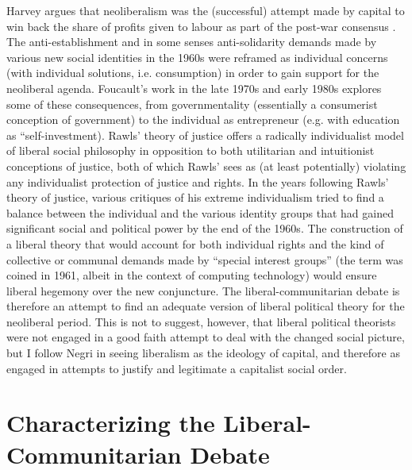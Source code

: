 \documentclass[12pt,oneside]{memoir}
\begin{document}
 Harvey argues that neoliberalism was the (successful) attempt made by capital to win back the share of profits given to labour as part of the post-war consensus \citep{harvey-2005}. The anti-establishment and in some senses anti-solidarity demands made by various new social identities in the 1960s were reframed as individual concerns (with individual solutions, i.e. consumption) in order to gain support for the neoliberal agenda. Foucault's work in the late 1970s and early 1980s explores some of these consequences, from governmentality (essentially a consumerist conception of government) to the individual as entrepreneur (e.g. with education as ``self-investment). Rawls' theory of justice offers a radically individualist model of liberal social philosophy in opposition to both utilitarian and intuitionist conceptions of justice, both of which Rawls' sees as (at least potentially) violating any individualist protection of justice and rights.
In the years following Rawls' theory of justice, various critiques of his extreme individualism tried to find a balance between the individual and the various identity groups that had gained significant social and political power by the end of the 1960s. The construction of a liberal theory that would account for both individual rights and the kind of collective or communal demands made by ``special interest groups'' (the term was coined in 1961, albeit in the context of computing technology) would ensure liberal hegemony over the new conjuncture. The liberal-communitarian debate is therefore an attempt to find an adequate version of liberal political theory for the neoliberal period. This is not to suggest, however, that liberal political theorists were not engaged in a good faith attempt to deal with the changed social picture, but I follow Negri in seeing liberalism as the ideology of capital, and therefore as engaged in attempts to justify and legitimate a capitalist social order.

\section*{Characterizing the Liberal-Communitarian Debate}
\end{document}
